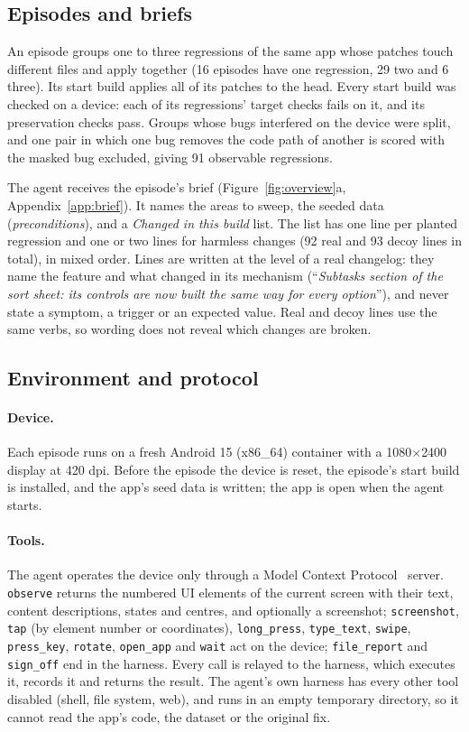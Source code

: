 \documentclass[11pt]{article}
\begin{document}
\subsection{Episodes and briefs}\label{sec:episodes}
An episode groups one to three regressions of the same app whose patches touch different files and
apply together (16 episodes have one regression, 29 two and 6 three). Its start build applies all
of its patches to the head. Every start build was checked on a device: each of its regressions'
target checks fails on it, and its preservation checks pass. Groups whose bugs interfered on the
device were split, and one pair in which one bug removes the code path of another is scored with
the masked bug excluded, giving 91 observable regressions.

The agent receives the episode's brief (Figure~\ref{fig:overview}a, Appendix~\ref{app:brief}). It
names the areas to sweep, the seeded data (\emph{preconditions}), and a \emph{Changed in this
build} list. The list has one line per planted regression and one or two lines for harmless
changes (92 real and 93 decoy lines in total), in mixed order. Lines are written at the level of a
real changelog: they name the feature and what changed in its mechanism (``\emph{Subtasks section
of the sort sheet: its controls are now built the same way for every option}''), and never state
a symptom, a trigger or an expected value. Real and decoy lines use the same verbs, so wording
does not reveal which changes are broken.

\subsection{Environment and protocol}\label{sec:protocol}
\paragraph{Device.} Each episode runs on a fresh Android 15 (x86\_64) container with a
1080$\times$2400 display at 420 dpi. Before the episode the device is reset, the episode's start
build is installed, and the app's seed data is written; the app is open when the agent starts.

\paragraph{Tools.} The agent operates the device only through a Model Context
Protocol~\cite{anthropic2024mcp} server. \texttt{observe} returns the numbered UI elements of the
current screen with their text, content descriptions, states and centres, and optionally a
screenshot; \texttt{screenshot}, \texttt{tap} (by element number or coordinates),
\texttt{long\_press}, \texttt{type\_text}, \texttt{swipe}, \texttt{press\_key}, \texttt{rotate},
\texttt{open\_app} and \texttt{wait} act on the device; \texttt{file\_report} and
\texttt{sign\_off} end in the harness. Every call is relayed to the harness, which executes it,
records it and returns the result. The agent's own harness has every other tool disabled (shell,
file system, web), and runs in an empty temporary directory, so it cannot read the app's code, the
dataset or the original fix.
\end{document}
